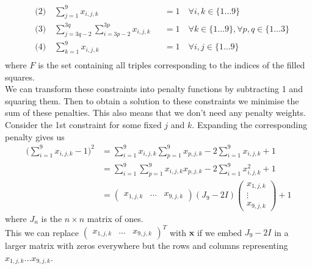 \documentclass{article}
\begin{document}
\begin{equation*}
\begin{aligned} 
&\text{(2)} \quad \sum_{j=1}^9 x_{i,j,k} &&= 1\quad \forall i,k \in \{1 \dots 9\} \\
&\text{(3)} \quad \sum_{j=3q-2}^{3q} \sum_{i=3p-2}^{3p} x_{i,j,k} &&= 1\quad \forall k \in \{1 \dots 9\}, \forall p,q \in \{1 \dots 3\}\\
&\text{(4)} \quad \sum_{k=1}^9 x_{i,j,k} &&= 1\quad \forall i,j \in \{1 \dots 9\} \\
\end{aligned}
\end{equation*}
where \(F\) is the set containing all triples corresponding to the indices of the filled squares. \\

\noindent We can transform these constraints into penalty functions by subtracting 1 and squaring them. Then to obtain a solution to these constraints we minimise the sum of these penalties. This also means that we don't need any penalty weights.\\

\noindent Consider the 1st constraint for some fixed \(j\) and \(k\). Expanding the corresponding penalty gives us
\begin{align*}
    \bigg(\sum_{i=1}^9 x_{i,j,k} - 1\bigg)^2 &= \sum_{i=1}^9 x_{i,j,k}\sum_{p=1}^9 x_{p,j,k} -2\sum_{i=1}^9 x_{i,j,k} + 1  \\
    &= \sum_{i=1}^9\sum_{p=1}^9 x_{i,j,k}x_{p,j,k} -2\sum_{i=1}^9 x_{i,j,k}^2 + 1 \\
    &= \begin{pmatrix}
        x_{1,j,k} & \dots & x_{9,j,k}
    \end{pmatrix} (J_9 - 2I) \begin{pmatrix}
        x_{1,j,k} \\
        \vdots \\
        x_{9,j,k}
    \end{pmatrix} + 1
\end{align*}
where \(J_n\) is the \(n \times n\) matrix of ones. \\

\noindent This we can replace \(\begin{pmatrix}
        x_{1,j,k} & \dots & x_{9,j,k}
    \end{pmatrix}^T\) with \(\mathbf{x}\) if we
    embed \(J_9 - 2I\) in a larger matrix with zeros everywhere but the rows and columns representing \(x_{1,j,k} \dots x_{9,j,k}\).\\
\end{document}

